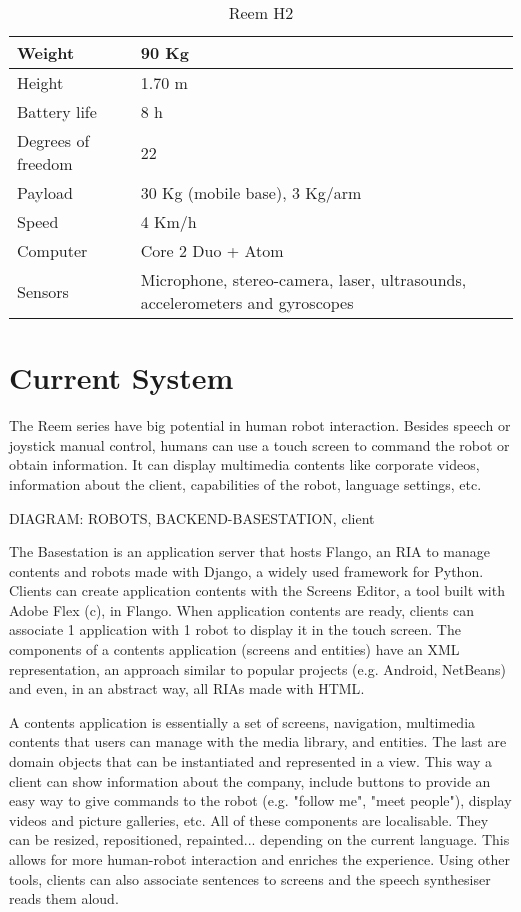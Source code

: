\begin{table}[ht]
    \centering
    \caption{Reem H2}
    \label{tab:rh2}
    \begin{tabularx}{\linewidth}{| X | X |}
    \hline
    Weight & 90 Kg \\ \hline
    Height & 1.70 m \\ \hline
    Battery life & 8 h \\ \hline
    Degrees of freedom & 22 \\ \hline
    Payload & 30 Kg (mobile base), 3 Kg/arm \\ \hline
    Speed & 4 Km/h \\ \hline
    Computer & Core 2 Duo + Atom \\ \hline
    Sensors & Microphone, stereo-camera, laser, ultrasounds, accelerometers and gyroscopes \\
    \hline
    \end{tabularx}
\end{table}


\section{Current System}
The Reem series have big potential in human robot interaction. 
Besides speech or joystick manual control, humans can use a touch screen to command the robot or obtain information.
It can display multimedia contents like corporate videos, information about the client, capabilities of the robot, language settings, etc.

DIAGRAM: ROBOTS, BACKEND-BASESTATION, client

The Basestation is an application server that hosts Flango, an \ac{RIA} to manage contents and robots made with Django, a widely used framework for Python. 
Clients can create application contents with the Screens Editor, a tool built with Adobe Flex (c), in Flango.
When application contents are ready, clients can associate 1 application with 1 robot to display it in the touch screen.
The components of a contents application (screens and entities) have an \ac{XML} representation, an approach similar to popular projects (e.g. Android, NetBeans) and even, in an abstract way, all \acp{RIA} made with \ac{HTML}.

A contents application is essentially a set of screens, navigation, multimedia contents that users can manage with the media library, and entities. 
The last are domain objects that can be instantiated and represented in a view. 
This way a client can show information about the company, include buttons to provide an easy way to give commands to the robot (e.g. "follow me", "meet people"), display videos and picture galleries, etc.
All of these components are localisable. 
They can be resized, repositioned, repainted... depending on the current language.
This allows for more human-robot interaction and enriches the experience. 
Using other tools, clients can also associate sentences to screens and the speech synthesiser reads them aloud.

